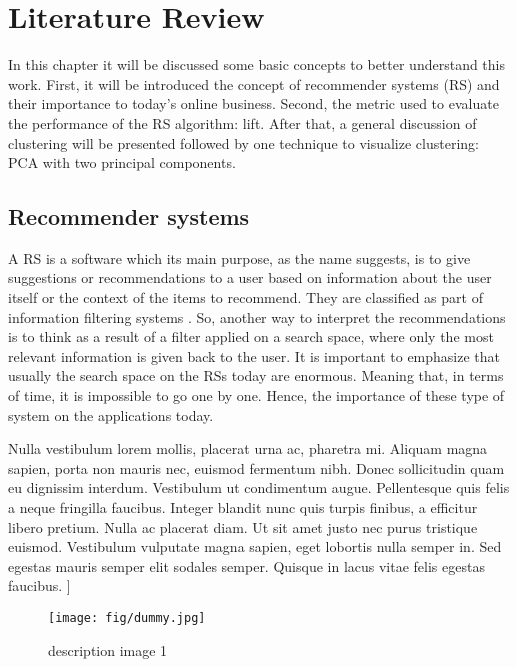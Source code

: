 \newcommand{\ASKA}{$\text{ASK}^0$}
\newcommand{\ASKS}{$\text{ASK}^*$}

\chapter{Literature Review}

In this chapter it will be discussed some basic concepts to better understand this work. First, it will be introduced the concept of  recommender systems (RS) and their importance to today's online business. Second, the metric used to evaluate the performance of the RS algorithm: lift. After that, a general discussion of clustering will be presented followed by one technique to visualize clustering: PCA with two principal components.


\section{Recommender systems}

A RS is a software which its main purpose, as the name suggests, is to give suggestions or recommendations to a user based on information about the user itself or the context of the items to recommend. They are classified as part of information filtering systems \cite{RecommendersystemWikipedia}. So, another way to interpret the recommendations is to think as a result of a filter applied on a search space, where only the most relevant information is given back to the user. It is important to emphasize that usually the search space on the RSs today are enormous. Meaning that, in terms of time, it is impossible to go one by one. Hence, the importance of these type of system on the applications today.



Nulla vestibulum lorem mollis, placerat urna ac, pharetra mi. Aliquam magna sapien, porta non mauris nec, euismod fermentum nibh. Donec sollicitudin quam eu dignissim interdum. Vestibulum ut condimentum augue. Pellentesque quis felis a neque fringilla faucibus. Integer blandit nunc quis turpis finibus, a efficitur libero pretium. Nulla ac placerat diam. Ut sit amet justo nec purus tristique euismod. Vestibulum vulputate magna sapien, eget lobortis nulla semper in. Sed egestas mauris semper elit sodales semper. Quisque in lacus vitae felis egestas faucibus. ]


\begin{figure}
       \centering
       \texttt{[image: fig/dummy.jpg]}
       \caption{description image 1}
       \label{image1}
\end{figure}

